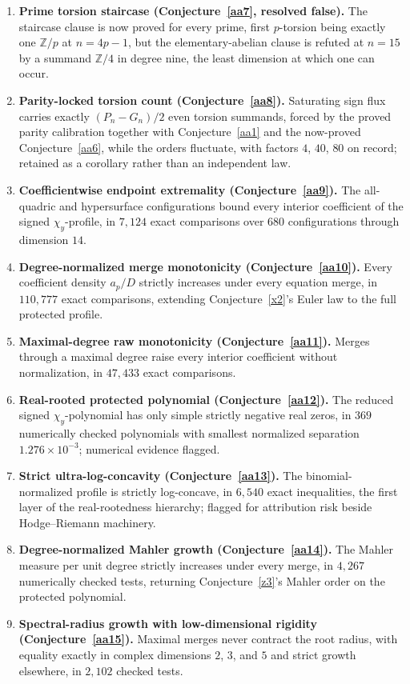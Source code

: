 \documentclass[11pt]{article}
\theoremstyle{definition}
\newcommand{\Z}{\mathbb Z}
\providecommand{\Z}{\mathbb Z}
\begin{document}
\begin{enumerate}
\item \textbf{Prime torsion staircase (Conjecture~\ref{aa7}, resolved false).} The staircase clause is now proved for every prime, first $p$-torsion being exactly one $\Z/p$ at $n=4p-1$, but the elementary-abelian clause is refuted at $n=15$ by a summand $\Z/4$ in degree nine, the least dimension at which one can occur.
\item \textbf{Parity-locked torsion count (Conjecture~\ref{aa8}).}  Saturating sign flux carries exactly $(P_n-G_n)/2$ even torsion summands, forced by the proved parity calibration together with Conjecture~\ref{aa1} and the now-proved Conjecture~\ref{aa6}, while the orders fluctuate, with factors $4$, $40$, $80$ on record; retained as a corollary rather than an independent law.
\item \textbf{Coefficientwise endpoint extremality (Conjecture~\ref{aa9}).}  The all-quadric and hypersurface configurations bound every interior coefficient of the signed $\chi_y$-profile, in $7{,}124$ exact comparisons over $680$ configurations through dimension $14$.
\item \textbf{Degree-normalized merge monotonicity (Conjecture~\ref{aa10}).}  Every coefficient density $a_p/D$ strictly increases under every equation merge, in $110{,}777$ exact comparisons, extending Conjecture~\ref{x2}'s Euler law to the full protected profile.
\item \textbf{Maximal-degree raw monotonicity (Conjecture~\ref{aa11}).}  Merges through a maximal degree raise every interior coefficient without normalization, in $47{,}433$ exact comparisons.
\item \textbf{Real-rooted protected polynomial (Conjecture~\ref{aa12}).}  The reduced signed $\chi_y$-polynomial has only simple strictly negative real zeros, in $369$ numerically checked polynomials with smallest normalized separation $1.276\times10^{-3}$; numerical evidence flagged.
\item \textbf{Strict ultra-log-concavity (Conjecture~\ref{aa13}).}  The binomial-normalized profile is strictly log-concave, in $6{,}540$ exact inequalities, the first layer of the real-rootedness hierarchy; flagged for attribution risk beside Hodge--Riemann machinery.
\item \textbf{Degree-normalized Mahler growth (Conjecture~\ref{aa14}).}  The Mahler measure per unit degree strictly increases under every merge, in $4{,}267$ numerically checked tests, returning Conjecture~\ref{z3}'s Mahler order on the protected polynomial.
\item \textbf{Spectral-radius growth with low-dimensional rigidity (Conjecture~\ref{aa15}).}  Maximal merges never contract the root radius, with equality exactly in complex dimensions $2$, $3$, and $5$ and strict growth elsewhere, in $2{,}102$ checked tests.

\end{enumerate}
\end{document}
